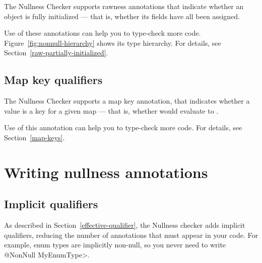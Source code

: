 The Nullness Checker supports rawness annotations that indicate whether
an object is fully initialized --- that is, whether its fields have all
been assigned.

\begin{description}
\item[]
\item[]
\item[]
\end{description}

Use of these annotations can help you to type-check more
code.  Figure~\ref{fig:nonnull-hierarchy} shows its type hierarchy.  For
details, see Section~\ref{raw-partially-initialized}.


\subsection{Map key qualifiers\label{map-key-qualifiers}}

The Nullness Checker supports a map key annotation,  that indicates whether
a value is a key for a given map --- that is, whether
 would evaluate to .

\begin{description}
\item[]
\end{description}

Use of this annotation can help you to type-check more code.  For details,
see Section~\ref{map-keys}.


\section{Writing nullness annotations\label{writing-nullness-annotations}}

\subsection{Implicit qualifiers\label{nullness-implicit-qualifiers}}

As described in Section~\ref{effective-qualifier}, the Nullness checker
adds implicit qualifiers, reducing the number of annotations that must
appear in your code.
For example, enum types are implicitly non-null, so you never need to write
\<@NonNull MyEnumType>.

